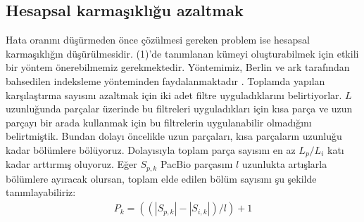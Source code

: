 \subsection{Hesapsal karmaşıklığu azaltmak}
Hata oranını düşürmeden önce çözülmesi gereken problem ise hesapsal karmaşıklığın düşürülmesidir. (1)'de tanımlanan kümeyi oluşturabilmek için etkili bir yöntem önerebilmemiz gerekmektedir. Yöntemimiz, Berlin ve ark tarafından bahsedilen indeksleme yönteminden faydalanmaktadır \cite{Berlin2015}. Toplamda yapılan karşılaştırma sayısını azaltmak için iki adet filtre uyguladıklarını belirtiyorlar. $L$ uzunluğunda parçalar üzerinde bu filtreleri uyguladıkları için kısa parça ve uzun parçayı bir arada kullanmak için bu filtrelerin uygulanabilir olmadığını belirtmiştik. Bundan dolayı öncelikle uzun parçaları, kısa parçaların uzunluğu kadar bölümlere bölüyoruz. Dolayısıyla toplam parça sayısını en az $L_p / L_i$ katı kadar arttırmış oluyoruz. Eğer $S_{p,k}$ PacBio parçasını $l$ uzunlukta artışlarla bölümlere ayıracak olursan, toplam elde edilen bölüm sayısını şu şekilde tanımlayabiliriz:
\begin{gather*}
P_k = ((|S_{p,k}| - |S_{i,k}| )/l) + 1
\end{gather*}
